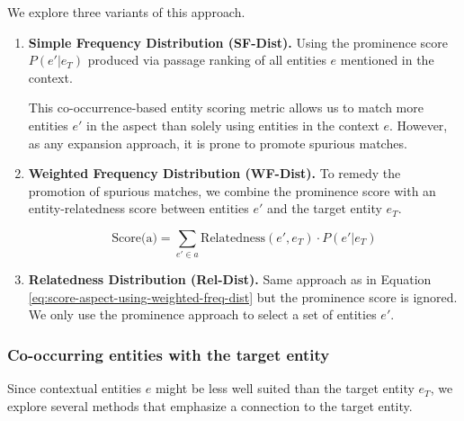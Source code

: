 We explore three variants of this approach.

\begin{enumerate}
     \item \textbf{Simple Frequency Distribution (SF-Dist).}
     Using the prominence score $P(e' \vert e_T)$ produced via passage ranking of all entities $e$ mentioned in the context.

This co-occurrence-based entity scoring metric allows us to match more entities $e'$ in the aspect than solely using entities in the context $e$. However, as any expansion approach, it is prone to promote spurious matches. 
 
 \item \textbf{Weighted Frequency Distribution (WF-Dist).} 
 To remedy the promotion of spurious matches, we combine the prominence score with an entity-relatedness score between entities $e'$ and the target entity $e_T$.
 
 \begin{equation}
         \label{eq:score-aspect-using-weighted-freq-dist}
        \text{Score(a)} = \sum_{e' \in a} \text{Relatedness}(e', e_T) \cdot P(e' \vert e_T)
    \end{equation}


\item \textbf{Relatedness Distribution (Rel-Dist).} 
Same approach as in Equation  \ref{eq:score-aspect-using-weighted-freq-dist} but the prominence score is ignored. We only use the prominence approach to select a set of entities $e'$. 

\end{enumerate}

\subsubsection{Co-occurring entities with the target entity} 
\label{subsubsec:Co-occurring entities with the target entity}

Since contextual entities $e$ might be less well suited than the target entity $e_T$, we explore several methods that emphasize a connection to the target entity.




